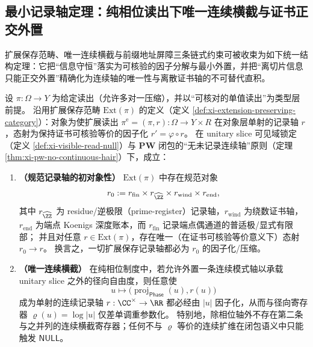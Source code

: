 

\subsection{最小记录轴定理：纯相位读出下唯一连续横截与证书正交外置}\label{subsec:cdim-minimal-record-axis}
扩展保存范畴、唯一连续横截与前缀地址屏障三条链式约束可被收束为如下统一结构定理：它把“信息守恒”落实为可核验的因子分解与最小外置，并把“离切片信息只能正交外置”精确化为连续轴的唯一性与离散证书轴的不可替代直积。

\begin{theorem}\label{thm:cdim-minimal-record-axis}
设 \(\pi:\Omega\to Y\) 为给定读出（允许多对一压缩），并以“可核对的单值读出”为类型层前提。
沿用扩展保存范畴 \(\mathrm{Ext}(\pi)\) 的定义（定义 \ref{def:xi-extension-preserving-category}）：对象为使扩展读出 \(\pi^{\mathrm e}=(\pi,r):\Omega\to Y\times R\) 在对象层单射的记录轴 \(r\)，态射为保持证书可核验等价的因子化 \(r'=\varphi\circ r\)。
在 unitary slice 可见域锁定（定义 \ref{def:xi-visible-read-null}）与 \(\mathbf{PW}\) 闭包的“无未记录连续轴”原则（定理 \ref{thm:xi-pw-no-continuous-hair}）下，成立：
\begin{enumerate}
  \item \textbf{（规范记录轴的初对象性）}
  \(\mathrm{Ext}(\pi)\) 中存在规范对象
  \[
  r_0:=r_{\mathrm{fin}}\times r_{\widehat{\ZZ}}\times r_{\mathrm{wind}}\times r_{\mathrm{end}},
  \]
  其中 \(r_{\widehat{\ZZ}}\) 为 residue/逆极限（prime-register）记录轴，\(r_{\mathrm{wind}}\) 为绕数证书轴，\(r_{\mathrm{end}}\) 为端点 Koenigs 深度账本，而 \(r_{\mathrm{fin}}\) 记录端点偶通道的普适极/显式有限部；
  并且对任意 \(r\in\mathrm{Ext}(\pi)\)，存在唯一（在证书可核验等价意义下）态射 \(r_0\to r\)。
  换言之，一切扩展保存记录轴都必为 \(r_0\) 的因子化/压缩。

  \item \textbf{（唯一连续横截）}
  在纯相位制度中，若允许外置一条连续模式轴以承载 unitary slice 之外的径向自由度，则任意使
  \[
  u\longmapsto\bigl(\operatorname{proj}_{\mathsf{Phase}}(u),r(u)\bigr)
  \]
  成为单射的连续记录轴 \(r:\CC^\times\to\RR\) 都必经由 \(|u|\) 因子化，从而与径向寄存器 \(\varrho(u)=\log|u|\) 仅差单调重参数化。
  特别地，除相位轴外不存在第二条与之并列的连续横截寄存器；任何不与 \(\varrho\) 等价的连续扩维在闭包语义中只能触发 \(\mathsf{NULL}\)。


\end{enumerate}
\end{theorem}
